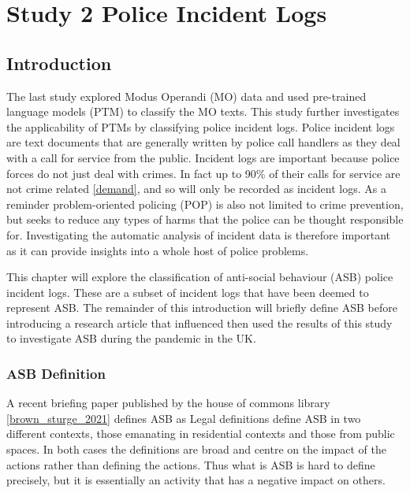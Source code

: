 
\chapter{Study 2  Police Incident Logs}


\section{Introduction}

The last study explored Modus Operandi (MO) data and used pre-trained language models (PTM) to classify the MO texts. This study further investigates the applicability of PTMs by classifying police incident logs.  Police incident logs are text documents that are generally written by police call handlers as they deal with a call for service from the public. Incident logs are important because police forces do not just deal with crimes. In fact up to 90\% of their calls for service are not crime related \ref{demand}, and so will only be recorded as incident logs. As a reminder problem-oriented policing (POP) is also not limited to crime prevention, but seeks to reduce any types of harms that the police can be thought responsible for. Investigating the automatic analysis of incident data is therefore important as it can provide insights into a whole host of police problems. 

This chapter will explore the classification of anti-social behaviour (ASB) police incident logs. These are a subset of incident logs that have been deemed to represent ASB. The remainder of this introduction will briefly define ASB before introducing a research article that influenced then used the results of this study to investigate ASB during the pandemic in the UK.  


\subsection{ASB Definition}
 A recent briefing paper published by the house of commons library \ref{brown_sturge_2021} defines ASB as   Legal definitions define ASB in two different contexts, those emanating in residential contexts and those from public spaces. In both cases the definitions are broad and centre on the impact of the actions rather than defining the actions. Thus what is ASB is hard to define precisely, but it is essentially an activity that has a negative impact on others.    
 
